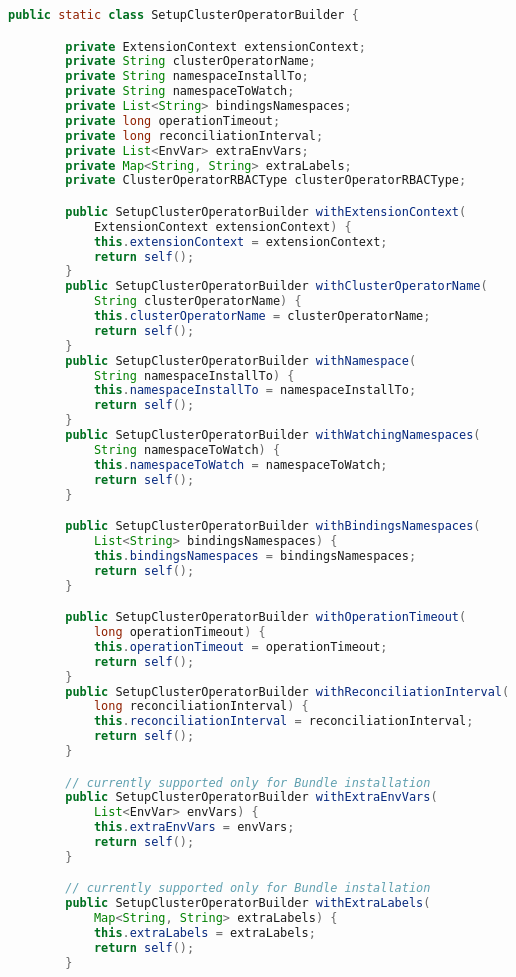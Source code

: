 \begin{lstlisting}[language=Java,label=cluster:operator:builder:pattern,caption=Cluster Operator builder pattern,frame=tb]
    public static class SetupClusterOperatorBuilder {

        private ExtensionContext extensionContext;
        private String clusterOperatorName;
        private String namespaceInstallTo;
        private String namespaceToWatch;
        private List<String> bindingsNamespaces;
        private long operationTimeout;
        private long reconciliationInterval;
        private List<EnvVar> extraEnvVars;
        private Map<String, String> extraLabels;
        private ClusterOperatorRBACType clusterOperatorRBACType;

        public SetupClusterOperatorBuilder withExtensionContext(
            ExtensionContext extensionContext) {
            this.extensionContext = extensionContext;
            return self();
        }
        public SetupClusterOperatorBuilder withClusterOperatorName(
            String clusterOperatorName) {
            this.clusterOperatorName = clusterOperatorName;
            return self();
        }
        public SetupClusterOperatorBuilder withNamespace(
            String namespaceInstallTo) {
            this.namespaceInstallTo = namespaceInstallTo;
            return self();
        }
        public SetupClusterOperatorBuilder withWatchingNamespaces(
            String namespaceToWatch) {
            this.namespaceToWatch = namespaceToWatch;
            return self();
        }

        public SetupClusterOperatorBuilder withBindingsNamespaces(
            List<String> bindingsNamespaces) {
            this.bindingsNamespaces = bindingsNamespaces;
            return self();
        }

        public SetupClusterOperatorBuilder withOperationTimeout(
            long operationTimeout) {
            this.operationTimeout = operationTimeout;
            return self();
        }
        public SetupClusterOperatorBuilder withReconciliationInterval(
            long reconciliationInterval) {
            this.reconciliationInterval = reconciliationInterval;
            return self();
        }

        // currently supported only for Bundle installation
        public SetupClusterOperatorBuilder withExtraEnvVars(
            List<EnvVar> envVars) {
            this.extraEnvVars = envVars;
            return self();
        }

        // currently supported only for Bundle installation
        public SetupClusterOperatorBuilder withExtraLabels(
            Map<String, String> extraLabels) {
            this.extraLabels = extraLabels;
            return self();
        }


\end{lstlisting}
